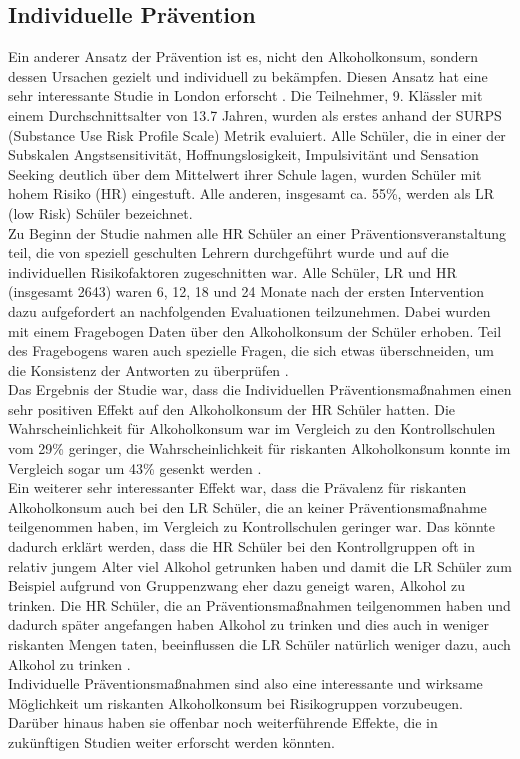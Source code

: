 \documentclass[12pt]{article}
\begin{document}
\subsection{Individuelle Prävention}
Ein anderer Ansatz der Prävention ist es, nicht den Alkoholkonsum, sondern dessen Ursachen gezielt und individuell zu bekämpfen. Diesen Ansatz hat eine sehr interessante Studie in London erforscht \autocite{conrod_effectiveness_2013}. Die Teilnehmer, 9. Klässler mit einem Durchschnittsalter von 13.7 Jahren, wurden als erstes anhand der SURPS (Substance Use Risk Profile Scale) Metrik evaluiert.%
Alle Schüler, die in einer der Subskalen Angstsensitivität, Hoffnungslosigkeit, Impulsivitänt und Sensation Seeking deutlich über dem Mittelwert ihrer Schule lagen, wurden Schüler mit hohem Risiko (HR) eingestuft. Alle anderen, insgesamt ca. 55\%, werden als LR (low Risk) Schüler bezeichnet.\\
Zu Beginn der Studie nahmen alle HR Schüler an einer Präventionsveranstaltung teil, die von speziell geschulten Lehrern durchgeführt wurde und auf die individuellen Risikofaktoren zugeschnitten war. %
Alle Schüler, LR und HR (insgesamt 2643) waren 6, 12, 18 und 24 Monate nach der ersten Intervention dazu aufgefordert an nachfolgenden Evaluationen teilzunehmen. Dabei wurden mit einem Fragebogen Daten über den Alkoholkonsum der Schüler erhoben. Teil des Fragebogens waren auch spezielle Fragen, die sich etwas überschneiden, um die Konsistenz der Antworten zu überprüfen \autocite[335]{conrod_effectiveness_2013}.\\%
Das Ergebnis der Studie war, dass die Individuellen Präventionsmaßnahmen einen sehr positiven Effekt auf den Alkoholkonsum der HR Schüler hatten. Die Wahrscheinlichkeit für Alkoholkonsum war im Vergleich zu den Kontrollschulen vom 29\% geringer, die Wahrscheinlichkeit für riskanten Alkoholkonsum konnte im Vergleich sogar um 43\% gesenkt werden \autocite[339]{conrod_effectiveness_2013}.\\
Ein weiterer sehr interessanter Effekt war, dass die Prävalenz für riskanten Alkoholkonsum auch bei den LR Schüler, die an keiner Präventionsmaßnahme teilgenommen haben, im Vergleich zu Kontrollschulen geringer war. Das könnte dadurch erklärt werden, dass die HR Schüler bei den Kontrollgruppen oft in relativ jungem Alter viel Alkohol getrunken haben und damit die LR Schüler zum Beispiel aufgrund von Gruppenzwang eher dazu geneigt waren, Alkohol zu trinken. Die HR Schüler, die an Präventionsmaßnahmen teilgenommen haben und dadurch später angefangen haben Alkohol zu trinken und dies auch in weniger riskanten Mengen taten, beeinflussen die LR Schüler natürlich weniger dazu, auch Alkohol zu trinken \autocite[340]{conrod_effectiveness_2013}.\\
Individuelle Präventionsmaßnahmen sind also eine interessante und wirksame Möglichkeit um riskanten Alkoholkonsum bei Risikogruppen vorzubeugen. Darüber hinaus haben sie offenbar noch weiterführende Effekte, die in zukünftigen Studien weiter erforscht werden könnten.
\end{document}
